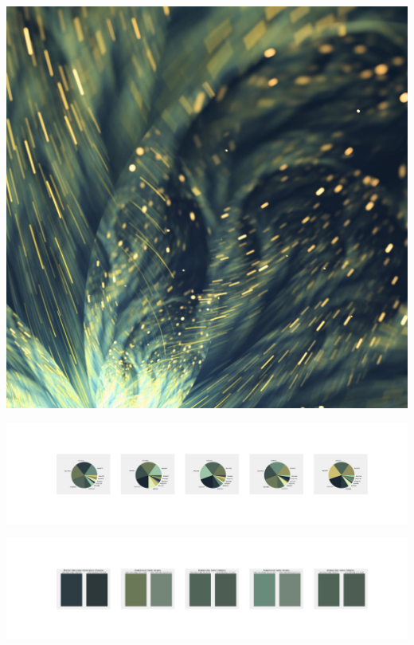 \documentclass[11pt]{article}
\begin{document}
\begin{landscape}
    \begin{center}
    \includegraphics[width=\textwidth]{./nbimg/file (387).jpg}
    \end{center}

    \begin{center}
    \includegraphics[width=250mm]{./nbimg/pie-319.jpg}
    \end{center}

    \begin{center}
    \includegraphics[width=250mm]{./nbimg/peak-319.jpg}
    \end{center}
    


\end{landscape}
\end{document}
